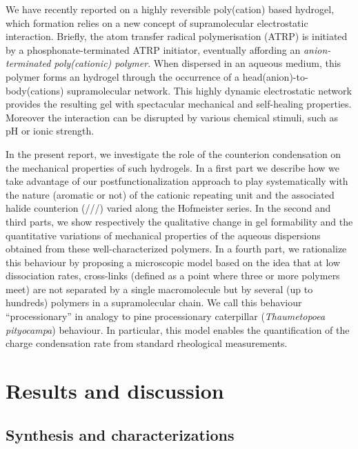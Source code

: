 \documentclass[twoside,twocolumn,9pt]{article}
\begin{document}
We have recently reported on a highly reversible poly(cation) based hydrogel\cite{Srour2014}, which formation relies on a new concept of supramolecular  electrostatic interaction. Briefly, the atom transfer radical polymerisation (ATRP) is initiated by a phosphonate-terminated ATRP initiator, eventually affording an \emph{anion-terminated poly(cationic) polymer}. When dispersed in an aqueous medium, this polymer forms an hydrogel through the occurrence of a head(anion)-to-body(cations) supramolecular network. This highly dynamic electrostatic network provides the resulting gel with spectacular mechanical and self-healing properties. Moreover the interaction can be disrupted by various chemical stimuli, such as pH or ionic strength.

In the present report, we investigate the role of the counterion condensation on the mechanical properties of such hydrogels. In a first part we describe how we take advantage of our postfunctionalization approach to play systematically with the nature (aromatic or not) of the cationic repeating unit and the associated halide counterion (///) varied along the Hofmeister series. In the second and third parts, we show respectively the qualitative change in gel formability and the quantitative variations of mechanical properties of the aqueous dispersions obtained from these well-characterized polymers. In a fourth part, we rationalize this behaviour by proposing a microscopic model based on the idea that at low dissociation rates, cross-links (defined as a point where three or more polymers meet) are not separated by a single macromolecule but by several (up to hundreds) polymers in a supramolecular chain. We call this behaviour ``processionary'' in analogy to pine processionary caterpillar (\textit{Thaumetopoea pityocampa}) behaviour\cite{Fabre1916}. In particular, this model enables the quantification of the charge condensation rate from standard rheological measurements.%


\section{Results and discussion}

\subsection{Synthesis and characterizations}
\end{document}

